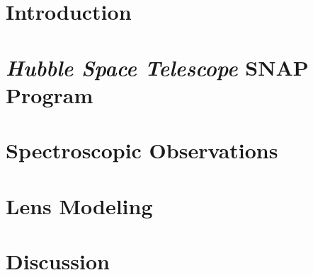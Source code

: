 \documentclass[preprint]{aastex631}
\newcommand{\HST}{\emph{Hubble Space Telescope}\xspace}
\begin{document}
\begin{abstract}
We present the Dark Energy Spectroscopic Instrument (DESI) Strong Lens Foundry. We discovered $\sim 3500$ new strong gravitational lens candidates in the DESI Legacy Imaging Surveys
using residual neural networks (ResNet). We observed a subset (51) of our candidates using the {\it Hubble Space Telescope} ({\it HST}). All of them were confirmed to be strong lenses. We also briefly describe spectroscopic follow-up observations by DESI and Keck NIRES programs. From this very rich dataset, a number of studies will be carried out, including evaluating the quality of the ResNet search candidates and lens modeling. In this paper, we present our initial effort in these directions. 
In particular, as a demonstration, we present the lens model for DESI-165.4754-06.0423, with imaging data from {\it HST}, and lens and source redshifts from DESI and Keck NIRES, respectively. 
In this effort, we have applied a \emph{fully} forward-modeling Bayesian approach (\texttt{GIGA-Lens}), using \emph{multiple} GPUs, for the first time in both regards, to a strong lens with {\it HST} data, or any high resolution imaging.
\end{abstract}

\section{Introduction}\label{sec:intro}


\FloatBarrier
\section{\HST SNAP Program}\label{sec:ls-hst}



\section{Spectroscopic Observations}\label{sec:spect}


\section{Lens Modeling}\label{sec:lens-model}


\section{Discussion}\label{sec:discussion}

\end{document}
